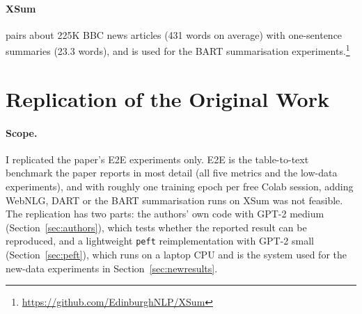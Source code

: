 \documentclass[11pt]{article}
\begin{document}
\paragraph{XSum} \citep{narayan-etal-2018-dont} pairs about 225K BBC news articles (431 words on average) with one-sentence summaries (23.3 words), and is used for the BART summarisation experiments.\footnote{\url{https://github.com/EdinburghNLP/XSum}}



\section{Replication of the Original Work}

\paragraph{Scope.} I replicated the paper's E2E experiments only. E2E is the table-to-text benchmark the paper reports in most detail (all five metrics and the low-data experiments), and with roughly one training epoch per free Colab session, adding WebNLG, DART or the BART summarisation runs on XSum was not feasible. The replication has two parts: the authors' own code with GPT-2 medium (Section~\ref{sec:authors}), which tests whether the reported result can be reproduced, and a lightweight \texttt{peft} reimplementation with GPT-2 small (Section~\ref{sec:peft}), which runs on a laptop CPU and is the system used for the new-data experiments in Section~\ref{sec:newresults}.
\end{document}

